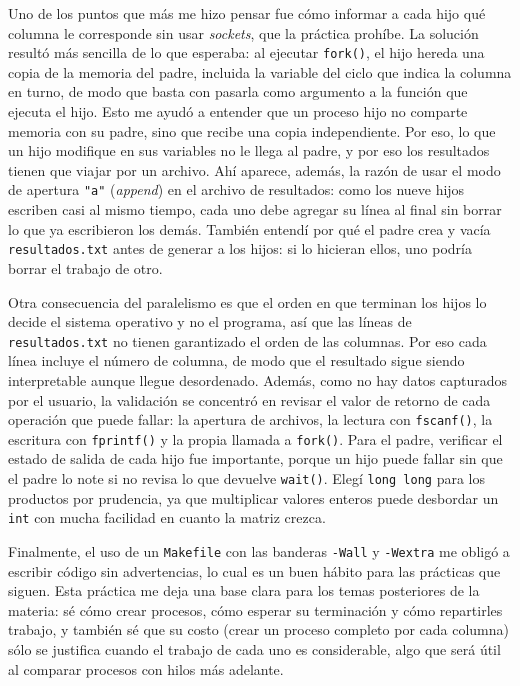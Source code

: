 Uno de los puntos que más me hizo pensar fue cómo informar a cada hijo qué columna le corresponde sin usar \emph{sockets}, que la práctica prohíbe. La solución resultó más sencilla de lo que esperaba: al ejecutar \texttt{fork()}, el hijo hereda una copia de la memoria del padre, incluida la variable del ciclo que indica la columna en turno, de modo que basta con pasarla como argumento a la función que ejecuta el hijo. Esto me ayudó a entender que un proceso hijo no comparte memoria con su padre, sino que recibe una copia independiente. Por eso, lo que un hijo modifique en sus variables no le llega al padre, y por eso los resultados tienen que viajar por un archivo. Ahí aparece, además, la razón de usar el modo de apertura \texttt{"a"} (\emph{append}) en el archivo de resultados: como los nueve hijos escriben casi al mismo tiempo, cada uno debe agregar su línea al final sin borrar lo que ya escribieron los demás. También entendí por qué el padre crea y vacía \texttt{resultados.txt} antes de generar a los hijos: si lo hicieran ellos, uno podría borrar el trabajo de otro.

Otra consecuencia del paralelismo es que el orden en que terminan los hijos lo decide el sistema operativo y no el programa, así que las líneas de \texttt{resultados.txt} no tienen garantizado el orden de las columnas. Por eso cada línea incluye el número de columna, de modo que el resultado sigue siendo interpretable aunque llegue desordenado. Además, como no hay datos capturados por el usuario, la validación se concentró en revisar el valor de retorno de cada operación que puede fallar: la apertura de archivos, la lectura con \texttt{fscanf()}, la escritura con \texttt{fprintf()} y la propia llamada a \texttt{fork()}. Para el padre, verificar el estado de salida de cada hijo fue importante, porque un hijo puede fallar sin que el padre lo note si no revisa lo que devuelve \texttt{wait()}. Elegí \texttt{long long} para los productos por prudencia, ya que multiplicar valores enteros puede desbordar un \texttt{int} con mucha facilidad en cuanto la matriz crezca.

Finalmente, el uso de un \texttt{Makefile} con las banderas \texttt{-Wall} y \texttt{-Wextra} me obligó a escribir código sin advertencias, lo cual es un buen hábito para las prácticas que siguen. Esta práctica me deja una base clara para los temas posteriores de la materia: sé cómo crear procesos, cómo esperar su terminación y cómo repartirles trabajo, y también sé que su costo (crear un proceso completo por cada columna) sólo se justifica cuando el trabajo de cada uno es considerable, algo que será útil al comparar procesos con hilos más adelante.

